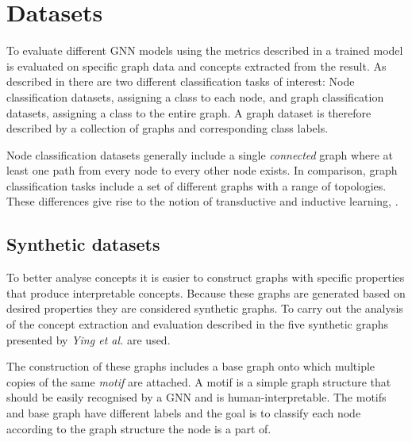 \section{Datasets}
\label{sec:datasets-theory}


To evaluate different GNN models using the metrics described in  a trained model is evaluated on specific graph data and concepts extracted from the result.
As described in  there are two different classification tasks of interest:
Node classification datasets, assigning a class to each node, and graph classification datasets, assigning a class to the entire graph.
A graph dataset is therefore described by a collection of graphs and corresponding class labels.

Node classification datasets generally include a single \emph{connected} graph where at least one path from every node to every other node exists.
In comparison, graph classification tasks include a set of different graphs with a range of topologies.
These differences give rise to the notion of transductive and inductive learning, .

\subsection{Synthetic datasets}
\label{sec:synth}


To better analyse concepts it is easier to construct graphs with specific properties that produce interpretable concepts.
Because these graphs are generated based on desired properties they are considered synthetic graphs.
To carry out the analysis of the concept extraction and evaluation described in  the five synthetic graphs presented by \textit{Ying et al.}\cite{ying2019gnnexplainer} are used.

The construction of these graphs includes a base graph onto which multiple copies of the same \emph{motif} are attached.
A motif is a simple graph structure that should be easily recognised by a GNN and is human-interpretable.
The motifs and base graph have different labels and the goal is to classify each node according to the graph structure the node is a part of.

